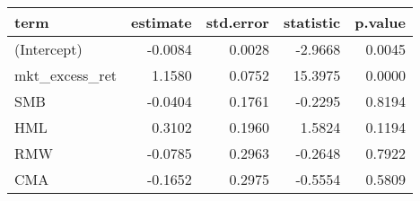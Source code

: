 \begin{table}[ht]
\centering
\begin{tabular}{lrrrr}
  \hline
term & estimate & std.error & statistic & p.value \\ 
  \hline
(Intercept) & -0.0084 & 0.0028 & -2.9668 & 0.0045 \\ 
  mkt\_excess\_ret & 1.1580 & 0.0752 & 15.3975 & 0.0000 \\ 
  SMB & -0.0404 & 0.1761 & -0.2295 & 0.8194 \\ 
  HML & 0.3102 & 0.1960 & 1.5824 & 0.1194 \\ 
  RMW & -0.0785 & 0.2963 & -0.2648 & 0.7922 \\ 
  CMA & -0.1652 & 0.2975 & -0.5554 & 0.5809 \\ 
   \hline
\end{tabular}
\label{tab: summary_neg_1}
\end{table}

